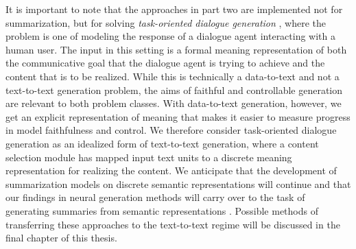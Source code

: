 It is important to note that the approaches in part two are implemented not for
summarization, but for solving \textit{task-oriented dialogue generation}
\citep{mairesse2010}, where the problem is one of modeling the response of a
dialogue agent interacting with a human user. The input in this setting is a
formal meaning representation of both the communicative goal that the dialogue
agent is trying to achieve and the content that is to be realized. While this
is technically a data-to-text and not a text-to-text generation problem, the
aims of faithful and controllable generation are relevant to both problem
classes.  With data-to-text generation, however, we get an explicit
representation of meaning that makes it easier to measure progress in model
faithfulness and control. We therefore consider task-oriented dialogue
generation as an idealized form of text-to-text generation, where a content
selection module has mapped input text units to a discrete meaning
representation for realizing the content.  We anticipate that the development
of summarization models on discrete semantic representations
\citep{falke2017,liao2018} will continue and that our findings in neural
generation methods will carry over to the task of generating summaries from
semantic representations \citep{hardy2018}. Possible methods of transferring
these approaches to the text-to-text regime will be discussed in the final
chapter of this thesis.
